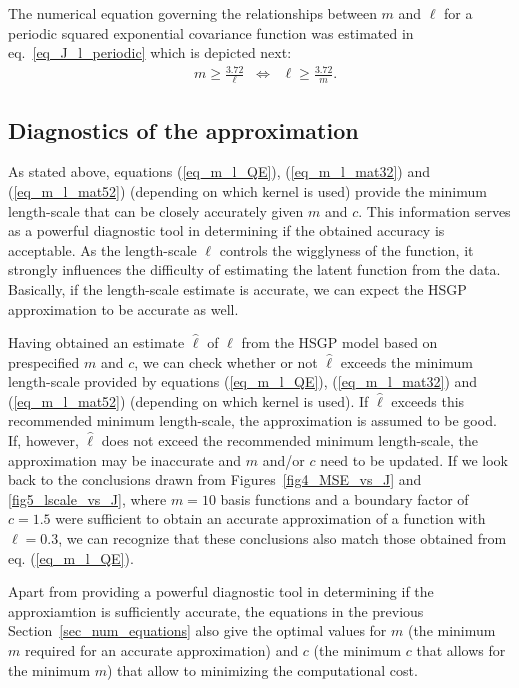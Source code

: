 The numerical equation governing the relationships between $m$ and $\ell$ for a periodic squared exponential covariance function was estimated in eq.~\eqref{eq_J_l_periodic} which is depicted next:
%
\begin{align*}
&m \geq \frac{3.72}{\ell} \;\; \Leftrightarrow \;\; \ell \geq \frac{3.72}{m} .
\end{align*}

\subsection{Diagnostics of the approximation} \label{subsec_diagnostics}

As stated above, equations (\ref{eq_m_l_QE}), (\ref{eq_m_l_mat32}) and (\ref{eq_m_l_mat52}) (depending on which kernel is used) provide the minimum length-scale that can be closely accurately given $m$ and $c$. This information serves as a powerful diagnostic tool in determining if the obtained accuracy is acceptable. As the length-scale $\ell$ controls the wigglyness of the function, it strongly influences the difficulty of estimating the latent function from the data. Basically, if the length-scale estimate is accurate, we can expect the HSGP approximation to be accurate as well.

Having obtained an estimate $\hat{\ell}$ of $\ell$ from the HSGP model based on prespecified $m$ and $c$, we can check whether or not $\hat{\ell}$ exceeds the minimum length-scale provided by equations (\ref{eq_m_l_QE}), (\ref{eq_m_l_mat32}) and (\ref{eq_m_l_mat52}) (depending on which kernel is used). If $\hat{\ell}$ exceeds this recommended minimum length-scale, the approximation is assumed to be good. If, however, $\hat{\ell}$ does not exceed the recommended minimum length-scale, the approximation may be inaccurate and $m$ and/or $c$ need to be updated. If we look back to the conclusions drawn from Figures~\ref{fig4_MSE_vs_J} and \ref{fig5_lscale_vs_J}, where $m = 10$ basis functions and a boundary factor of $c = 1.5$ were sufficient to obtain an accurate approximation of a function with $\ell = 0.3$, we can recognize that these conclusions also match those obtained from eq. (\ref{eq_m_l_QE}).

Apart from providing a powerful diagnostic tool in determining if the approxiamtion is sufficiently accurate, the equations in the previous Section~\ref{sec_num_equations} also give the optimal values for $m$ (the minimum $m$ required for an accurate approximation) and $c$ (the minimum $c$ that allows for the minimum $m$) that allow to minimizing the computational cost.

